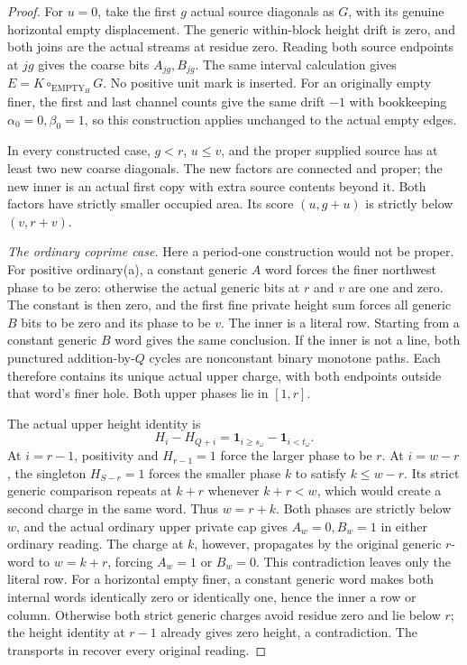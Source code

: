 \documentclass[11pt,a4paper]{amsart}
\numberwithin{equation}{section}
\theoremstyle{plain}
\theoremstyle{definition}
\newcommand{\one}{\mathbf1}
\begin{document}
\begin{proof}
For \(u=0\), take the first \(g\) actual source diagonals as \(G\), with its genuine horizontal empty displacement.  The generic within-block height drift is zero, and both joins are the actual streams at residue zero.  Reading both source endpoints at \(jg\) gives the coarse bits \(A_{jg},B_{jg}\).  The same interval calculation gives \(E=K\circ_{\mathrm{EMPTY}_H}G\).  No positive unit mark is inserted.  For an originally empty finer, the first and last channel counts give the same drift \(-1\) with bookkeeping \(\alpha_0=0,\beta_0=1\), so this construction applies unchanged to the actual empty edges.

In every constructed case, \(g<r\), \(u\le v\), and the proper supplied source has at least two new coarse diagonals.  The new factors are connected and proper; the new inner is an actual first copy with extra source contents beyond it.  Both factors have strictly smaller occupied area.  Its score \((u,g+u)\) is strictly below \((v,r+v)\).

\smallskip\noindent\emph{The ordinary coprime case.}
Here a period-one construction would not be proper.  For positive ordinary(a), a constant generic \(A\) word forces the finer northwest phase to be zero: otherwise the actual generic bits at \(r\) and \(v\) are one and zero.  The constant is then zero, and the first fine private height sum forces all generic \(B\) bits to be zero and its phase to be \(v\).  The inner is a literal row.  Starting from a constant generic \(B\) word gives the same conclusion.  If the inner is not a line, both punctured addition-by-\(Q\) cycles are nonconstant binary monotone paths.  Each therefore contains its unique actual upper charge, with both endpoints outside that word's finer hole.  Both upper phases lie in \([1,r]\).

The actual upper height identity is
\[
 H_i-H_{Q+i}=\one_{i\ge s_\omega}-\one_{i<t_\omega}.
\]
At \(i=r-1\), positivity and \(H_{r-1}=1\) force the larger phase to be \(r\).  At \(i=w-r\), the singleton \(H_{S-r}=1\) forces the smaller phase \(k\) to satisfy \(k\le w-r\).  Its strict generic comparison repeats at \(k+r\) whenever \(k+r<w\), which would create a second charge in the same word.  Thus \(w=r+k\).  Both phases are strictly below \(w\), and the actual ordinary upper private cap gives \(A_w=0,B_w=1\) in either ordinary reading.  The charge at \(k\), however, propagates by the original generic \(r\)-word to \(w=k+r\), forcing \(A_w=1\) or \(B_w=0\).  This contradiction leaves only the literal row.  For a horizontal empty finer, a constant generic word makes both internal words identically zero or identically one, hence the inner a row or column.  Otherwise both strict generic charges avoid residue zero and lie below \(r\); the height identity at \(r-1\) already gives zero height, a contradiction.  The transports in  recover every original reading.
\end{proof}
\end{document}

